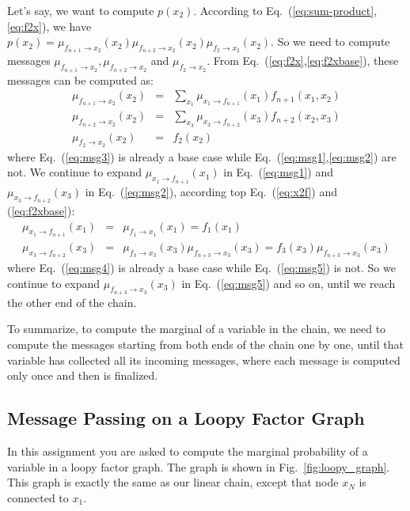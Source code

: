 \documentclass[11pt]{article}
\begin{document}
Let's say, we want to compute $p(x_2)$. According to Eq.~(\ref{eq:sum-product},\ref{eq:f2x}), we have \\$p(x_2)=\mu_{f_{n+1}\rightarrow x_2}(x_2)\mu_{f_{n+2}\rightarrow x_2}(x_2)\mu_{f_2\rightarrow x_2}(x_2)$. So we need to compute messages $\mu_{f_{n+1}\rightarrow x_2},\mu_{f_{n+2}\rightarrow x_2}$ and $\mu_{f_2\rightarrow x_2}$. From Eq.~(\ref{eq:f2x},\ref{eq:f2xbase}), these messages can be computed as:
\begin{eqnarray}
\label{eq:msg1}
\mu_{f_{n+1}\rightarrow x_2}(x_2)&=&\sum_{x_1}\mu_{x_1\rightarrow f_{n+1}}(x_1)f_{n+1}(x_1,x_2) \\
\label{eq:msg2}
\mu_{f_{n+2}\rightarrow x_2}(x_2)&=&\sum_{x_3}\mu_{x_3\rightarrow f_{n+2}}(x_3)f_{n+2}(x_2,x_3) \\
\label{eq:msg3}
\mu_{f_2\rightarrow x_2}(x_2)&=&f_{2}(x_2)
\end{eqnarray}
where Eq.~(\ref{eq:msg3}) is already a base case while Eq.~(\ref{eq:msg1},\ref{eq:msg2}) are not.
We continue to expand $\mu_{x_1\rightarrow f_{n+1}}(x_1)$ in Eq.~(\ref{eq:msg1}) and $\mu_{x_3\rightarrow f_{n+2}}(x_3)$ in Eq.~(\ref{eq:msg2}), according top Eq.~(\ref{eq:x2f}) and (\ref{eq:f2xbase}):
\begin{eqnarray}
\label{eq:msg4}
\mu_{x_1\rightarrow f_{n+1}}(x_1)&=&\mu_{f_1\rightarrow x_1}(x_1)=f_1(x_1) \\
\label{eq:msg5}
\mu_{x_3\rightarrow f_{n+2}}(x_3)&=&\mu_{f_3\rightarrow x_3}(x_3)\mu_{f_{n+3}\rightarrow x_3}(x_3)=f_3(x_3)\mu_{f_{n+3}\rightarrow x_3}(x_3)
\end{eqnarray}
where Eq.~(\ref{eq:msg4}) is already a base case while Eq.~(\ref{eq:msg5}) is not. So we continue to expand $\mu_{f_{n+3}\rightarrow x_3}(x_3)$ in Eq.~(\ref{eq:msg5}) and so on, until we reach the other end of the chain. 

To summarize, to compute the marginal of a variable in the chain, we need to compute the messages starting from both ends of the chain one by one, until that variable has collected all its incoming messages, where each message is computed only once and then is finalized. 

\subsection{Message Passing on a Loopy Factor Graph}
In this assignment you are asked to compute the marginal probability of a variable in a loopy factor graph. The graph is shown in Fig.~{\ref{fig:loopy_graph}}. This graph is exactly the same as our linear chain, except that node $x_N$ is 
connected to $x_1$.
\end{document}
